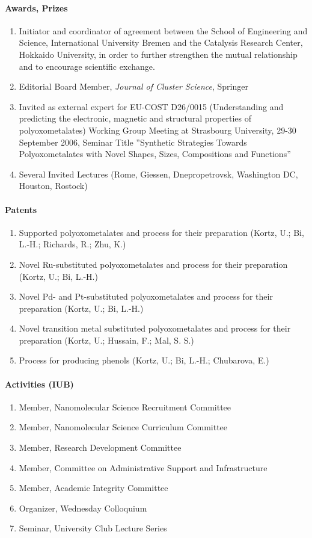 \paragraph{Awards, Prizes}
\begin{enumerate}
\item Initiator and coordinator of agreement between the School of Engineering and
  Science, International University Bremen and the Catalysis Research Center, Hokkaido
  University, in order to further strengthen the mutual relationship and to encourage
  scientific exchange.
\item Editorial Board Member, \emph{Journal of Cluster Science}, Springer
\item Invited as external expert for EU-COST D26/0015 (Understanding and predicting the
  electronic, magnetic and structural properties of polyoxometalates) Working Group
  Meeting at Strasbourg University, 29-30 September 2006, Seminar Title ''Synthetic
  Strategies Towards Polyoxometalates with Novel Shapes, Sizes, Compositions and
  Functions''
\item Several Invited Lectures (Rome, Giessen, Dnepropetrovsk, Washington DC, Houston,
  Rostock)
\end{enumerate}

\paragraph{Patents}
\begin{enumerate}
\item Supported polyoxometalates and process for their preparation (Kortz, U.; Bi, L.-H.;
  Richards, R.; Zhu, K.)
\item Novel Ru-substituted polyoxometalates and process for their preparation (Kortz, U.;
  Bi, L.-H.)
\item Novel Pd- and Pt-substituted polyoxometalates and process for their preparation
  (Kortz, U.; Bi, L.-H.)
\item Novel transition metal substituted polyoxometalates and process for their
  preparation (Kortz, U.; Hussain, F.; Mal, S. S.)
\item Process for producing phenols (Kortz, U.; Bi, L.-H.; Chubarova, E.)
\end{enumerate}

\paragraph{Activities (IUB)}
\begin{enumerate}
\item  Member, Nanomolecular Science Recruitment Committee
\item Member, Nanomolecular Science Curriculum Committee
\item Member, Research Development Committee
\item Member, Committee on Administrative Support and Infrastructure
\item Member, Academic Integrity Committee
\item Organizer, Wednesday Colloquium
\item Seminar, University Club Lecture Series
\end{enumerate}


